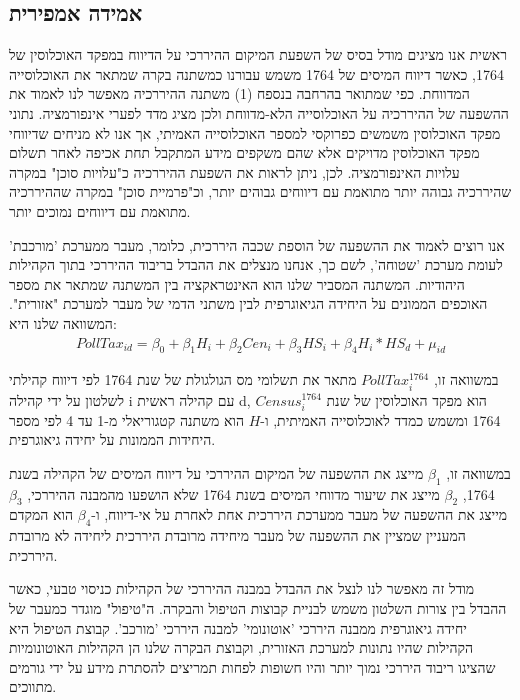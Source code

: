 \subsection{אמידה אמפירית}

ראשית אנו מציגים מודל בסיס של השפעת המיקום ההיררכי על הדיווח במפקד האוכלוסין של 1764, כאשר דיווח המיסים של 1764 משמש עבורנו כמשתנה בקרה שמתאר את האוכלוסייה המדווחת. כפי שמתואר בהרחבה בנספח (1)  משתנה ההיררכיה מאפשר לנו לאמוד את ההשפעה של ההיררכיה על האוכלוסייה הלא-מדווחת ולכן מציג מדד לפערי אינפורמציה. נתוני מפקד האוכלוסין משמשים כפרוקסי למספר האוכלוסייה האמיתי, אך אנו לא מניחים שדיווחי מפקד האוכלוסין מדויקים אלא שהם משקפים מידע המתקבל תחת אכיפה לאחר תשלום עלויות האינפורמציה. לכן, ניתן לראות את השפעת ההיררכיה כ"עלויות סוכן" במקרה שהיררכיה גבוהה יותר מתואמת עם דיווחים גבוהים יותר, וכ"פרמיית סוכן" במקרה שההיררכיה מתואמת עם דיווחים נמוכים יותר.

אנו רוצים לאמוד את ההשפעה של הוספת שכבה היררכית, כלומר, מעבר ממערכת 'מורכבת' לעומת מערכת 'שטוחה', לשם כך, אנחנו מנצלים את ההבדל בריבוד ההיררכי בתוך הקהילות היהודיות. המשתנה המסביר שלנו הוא האינטראקציה בין המשתנה שמתאר את מספר האוכפים הממונים על היחידה הגיאוגרפית לבין משתני הדמי של מעבר למערכת "אזורית". 
המשוואה שלנו היא:
\begin{align}
    PollTax_{id} = \beta_0 + \beta_1 H_i + \beta_2 Cen_i + \beta_3 HS_i + \beta_4 H_i*HS_d + \mu_{id}
\end{align}

במשוואה זו, $PollTax^{1764}_i$ מתאר את תשלומי מס הגולגולת של שנת 1764 לפי דיווח קהילתי לשלטון על ידי קהילה i עם קהילה ראשית d, $Census^{1764}_i$ הוא מפקד האוכלוסין של שנת 1764 ומשמש כמדד לאוכלוסייה האמיתית, ו-$H$ הוא משתנה קטגוריאלי מ-1 עד 4 לפי מספר היחידות הממונות על יחידה גיאוגרפית.

במשוואה זו, $\beta_1$ מייצג את ההשפעה של המיקום ההיררכי על דיווח המיסים של הקהילה בשנת 1764, $\beta_2$ מייצג את שיעור מדווחי המיסים בשנת 1764 שלא הושפעו מהמבנה ההיררכי, $\beta_3$ מייצג את ההשפעה של מעבר ממערכת היררכית אחת לאחרת על אי-דיווח, ו-$\beta_4$ הוא המקדם המעניין שמציין את ההשפעה של מעבר מיחידה מרובדת היררכית ליחידה לא מרובדת היררכית.

מודל זה מאפשר לנו לנצל את ההבדל במבנה ההיררכי של הקהילות כניסוי טבעי, כאשר ההבדל בין צורות השלטון משמש לבניית קבוצות הטיפול והבקרה. ה"טיפול" מוגדר כמעבר של יחידה גיאוגרפית ממבנה היררכי 'אוטונומי' למבנה היררכי 'מורכב'. קבוצת הטיפול היא הקהילות שהיו נתונות למערכת האזורית, וקבוצת הבקרה שלנו הן הקהילות האוטונומיות שהציגו ריבוד היררכי נמוך יותר והיו חשופות לפחות תמריצים להסתרת מידע על ידי גורמים מתווכים.

